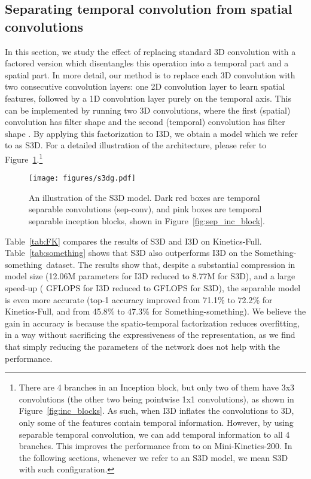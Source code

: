 \documentclass[runningheads]{llncs}
\newcommand{\MK}{Mini-Kinetics-200}
\newcommand{\Something}{Something-something}
\newcommand{\FK}{Kinetics-Full}
\begin{document}
 
\subsection{Separating temporal convolution from spatial convolutions}
\label{sec:sepconv}


In this section, we study the effect of replacing  standard 3D convolution with a
factored version which disentangles this operation into a temporal part and a spatial part.
In more detail, our method is to 
 replace each 3D convolution with two consecutive convolution layers: one 2D convolution layer to learn spatial features, followed by a 1D convolution layer purely on the temporal axis.
This can be implemented  by running two 3D convolutions, where the first (spatial) convolution has filter shape  and the 
second (temporal) convolution has filter shape .
By applying this factorization to I3D, we obtain a
model which we refer to as S3D. For a detailed illustration of the architecture, please refer to Figure~\ref{fig:s3d}.\footnote{
There are 4 branches in an Inception block, but only two of them have 3x3 convolutions (the other two being pointwise 1x1 convolutions), as shown in Figure~\ref{fig:inc_blocks}. 
As such, when I3D inflates the convolutions to 3D, only some of the features contain temporal information.
However, by using  separable temporal convolution, we can add temporal information  to all 4 branches.
This improves the performance from  to  on \MK.
In the following sections, whenever we refer to an S3D model, we mean S3D with such configuration.
}


\begin{figure}[!htp]
\begin{center}
\texttt{[image: figures/s3dg.pdf]}
\end{center}
\caption{
An illustration of the S3D model.
Dark red boxes are
temporal separable convolutions (sep-conv),
and pink boxes are temporal separable
inception blocks, shown in 
Figure~\ref{fig:sep_inc_block}.
}
\label{fig:s3d}
\end{figure}


\label{sec:resultsSeparable}

Table~\ref{tab:FK}
compares the results of S3D and I3D on \FK. Table~\ref{tab:something} shows that S3D also outperforms I3D on the \Something\ dataset.
The results show that, despite a substantial compression in model size
(12.06M parameters for I3D reduced to 8.77M for S3D),
and a large speed-up ( GFLOPS for I3D reduced to  GFLOPS for 
S3D), the separable model is even more accurate
(top-1 accuracy improved from 71.1\% to 72.2\% for \FK, and from 45.8\% to 47.3\% for \Something).
We believe the gain in accuracy is because the
spatio-temporal
factorization reduces overfitting, in a way without sacrificing the expressiveness of the representation, as we find that simply reducing the parameters of the network does not help with the performance.
\end{document}
